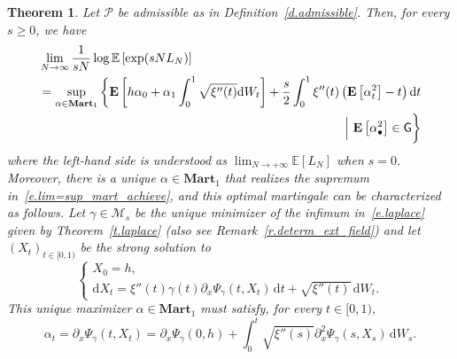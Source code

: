 \documentclass[11pt]{amsart}
\newtheorem{theorem}[proposition]{Theorem}
\theoremstyle{remark}
\theoremstyle{definition}
\numberwithin{equation}{section}
\numberwithin{proposition}{section}
\numberwithin{figure}{section}
\numberwithin{table}{section}
\newcommand{\E}{\mathbb{E}}
\newcommand{\EE}{\mathbf{E}}
\renewcommand{\geq}{\geqslant}
\newcommand{\Ll}{\left}
\newcommand{\Rr}{\right}
\renewcommand{\d}{\mathrm{d}}
\newcommand{\dr}{\partial}
\newcommand{\1}{\mathbf{1}}
\newcommand{\mcl}{\mathcal}
\newcommand{\msf}{\mathsf}
\newcommand{\msc}{\mathscr}
\newcommand{\al}{\alpha}
\newcommand{\ga}{\gamma}
\newcommand{\bmart}{\mathbf{Mart}}
\newcommand{\cM}{\mathcal{M}}
\begin{document}
\begin{theorem}\label{t.laplace_uninvert}
Let $\msc P$ be admissible as in Definition~\ref{d.admissible}. Then, for every $s\geq 0$, we have
\begin{align}\label{e.lim=sup_mart_achieve}
\begin{alignedat}{2}
&\lim_{N\to \infty} \frac{1}{sN} \log \E \Ll[ \exp(sN L_N) \Rr] \\
&=\sup_{\alpha\in\bmart_1}\bigg\{\EE\Ll[h\alpha_0 + \alpha_1\int_0^1\sqrt{\xi''(t)}\d W_t\Rr]+\frac{s}{2}\int_0^1 \xi''(t)\Ll(\EE\Ll[\alpha_t^2\Rr] -t \Rr)\d t
\end{alignedat} \\
\begin{alignedat}{2}
& & & \Big|\ \EE\Ll[\alpha^2_\bullet\Rr]\in \msf G\bigg\} \notag
\end{alignedat}
\end{align}
where the left-hand side is understood as $\lim_{N \to +\infty} \E[L_N] $ when $s=0$. Moreover, there is a unique $\alpha\in \bmart_1$ that realizes the supremum in~\eqref{e.lim=sup_mart_achieve}, and this optimal martingale can be characterized as follows.
Let $\gamma\in\cM_s$ be the unique minimizer of the infimum in~\eqref{e.laplace} given by Theorem~\ref{t.laplace} (also see Remark~\ref{r.determ_ext_field}) and let $(X_t)_{t \in [0,1)}$ be the strong solution to 
\begin{equation}  
\label{e.AC.SDE}
\Ll\{
\begin{array}{ll}  %
X_0 = h, \\
\d X_t = \xi''(t) \ga(t) \dr_x \Psi_{\ga}(t, X_t) \, \d t + \sqrt{\xi''(t)} \, \d W_t.
\end{array}
\Rr.
\end{equation}
This unique maximizer $\al \in \bmart_1$ must satisfy, for every $t \in [0,1)$,
\begin{equation}  
\label{e.identity.alpha}
\al_t = \dr_x \Psi_{\ga}(t,X_t) = \dr_x \Psi_{\ga}(0,h) +  \int_0^t \sqrt{\xi''(s)} \dr_x^2 \Psi_{\ga}(s,X_s) \, \d W_s.
\end{equation}
\end{theorem}



\end{document}
